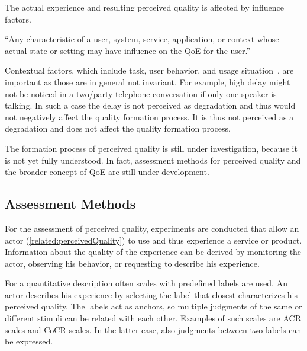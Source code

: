 The actual experience and resulting perceived quality is affected by influence factors.
\begin{definition}
``Any characteristic of a user, system, service, application, or context whose actual state or setting may have influence on the \acl{QoE} for the user.''~\citep[][p.\,56]{reiter_factors_2014}
\end{definition}
Contextual factors, which include task, user behavior, and usage situation~\citep[][p.\,56]{reiter_factors_2014}, are important as those are in general not invariant.
For example, high delay might not be noticed in a two\=/party telephone conversation if only one speaker is talking.
In such a case the delay is not perceived as degradation and thus would not negatively affect the quality formation process.
It is thus not perceived as a degradation and does not affect the quality formation process. %

The formation process of perceived quality is still under investigation, because it is not yet fully understood. %
In fact, assessment methods for perceived quality and the broader concept of \ac{QoE} are still under development.

\subsection{Assessment Methods}
For the assessment of perceived quality, experiments are conducted that allow an actor (\autoref{related:perceivedQuality}) to use and thus experience a service or product.
Information about the quality of the experience can be derived by monitoring the actor, observing his behavior, or requesting to describe his experience.

For a quantitative description often scales with predefined labels are used.
An actor describes his experience by selecting the label that closest characterizes his perceived quality.
The labels act as anchors, so multiple judgments of the same or different stimuli can be related with each other.
Examples of such scales are \acf{ACR} scales and \acf{CoCR} scales.
In the latter case, also judgments between two labels can be expressed.

